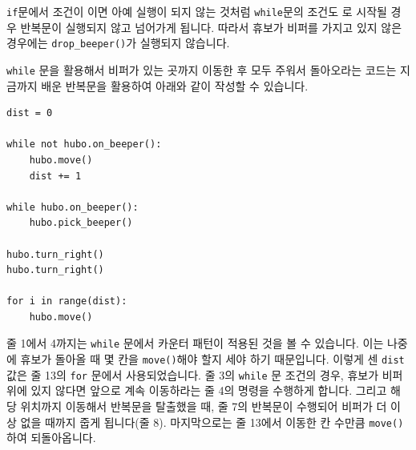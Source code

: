 \documentclass[../main.tex]{subfiles}
\begin{document}
\texttt{if}문에서 조건이 이면 아예 실행이 되지 않는 것처럼 \texttt{while}문의 조건도 로 시작될 경우 반복문이 실행되지 않고 넘어가게 됩니다.
따라서 휴보가 비퍼를 가지고 있지 않은 경우에는 \texttt{drop\_beeper()}가 실행되지 않습니다.

\texttt{while} 문을 활용해서 비퍼가 있는 곳까지 이동한 후 모두 주워서 돌아오라는 코드는 지금까지 배운 반복문을 활용하여 아래와 같이 작성할 수 있습니다.
\begin{verbatim}
dist = 0

while not hubo.on_beeper():
    hubo.move()
    dist += 1

while hubo.on_beeper():
    hubo.pick_beeper()

hubo.turn_right()
hubo.turn_right()

for i in range(dist):
    hubo.move()
\end{verbatim}
줄 1에서 4까지는 \texttt{while} 문에서 카운터 패턴이 적용된 것을 볼 수 있습니다.
이는 나중에 휴보가 돌아올 때 몇 칸을 \texttt{move()}해야 할지 세야 하기 때문입니다.
이렇게 센 \texttt{dist} 값은 줄 13의 \texttt{for} 문에서 사용되었습니다.
줄 3의 \texttt{while} 문 조건의 경우, 휴보가 비퍼 위에 있지 않다면 앞으로 계속 이동하라는 줄 4의 명령을 수행하게 합니다.
그리고 해당 위치까지 이동해서 반복문을 탈출했을 때, 줄 7의 반복문이 수행되어 비퍼가 더 이상 없을 때까지 줍게 됩니다(줄 8).
마지막으로는 줄 13에서 이동한 칸 수만큼 \texttt{move()}하여 되돌아옵니다.
\end{document}
